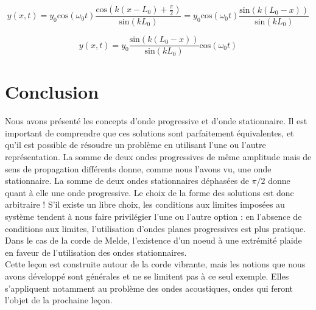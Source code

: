 \documentclass[11pt,a4paper]{report}
\begin{document}
\begin{equation}
	y(x,t) = y_0\text{cos}(\omega_0 t) \frac{\text{cos}(k(x-L_0)+\frac{\pi}{2})}{\text{sin}(k L_0)} =  y_0\text{cos}(\omega_0 t)  \frac{\text{sin}(k(L_0 - x))}{\text{sin}(k L_0)}
\end{equation}

\begin{equation}
	y(x,t) =  y_0  \frac{\text{sin}(k(L_0 - x))}{\text{sin}(k L_0)} \text{cos}(\omega_0 t)
\end{equation}

\section{Conclusion}

Nous avons présenté les concepts d'onde progressive et d'onde stationnaire. Il est important de comprendre que ces solutions sont parfaitement équivalentes, et qu'il est possible de résoudre un problème en utilisant l'une ou l'autre représentation. La somme de deux ondes progressives de même amplitude mais de sens de propagation différents donne, comme nous l'avons vu, une onde stationnaire. La somme de deux ondes stationnaires déphasées de $\pi/2$ donne quant à elle une onde progressive. Le choix de la forme des solutions est donc arbitraire ! S'il existe un libre choix, les conditions aux limites imposées au système tendent à nous faire privilégier l'une ou l'autre option : en l'absence de conditions aux limites, l'utilisation d'ondes planes progressives est plus pratique. Dans le cas de la corde de Melde, l'existence d'un noeud à une extrémité plaide en faveur de l'utilisation des ondes stationnaires.\\

Cette leçon est construite autour de la corde vibrante, mais les notions que nous avons développé sont générales et ne se limitent pas à ce seul exemple. Elles s'appliquent notamment au problème des ondes acoustiques, ondes qui feront l'objet de la prochaine leçon.
\end{document}
